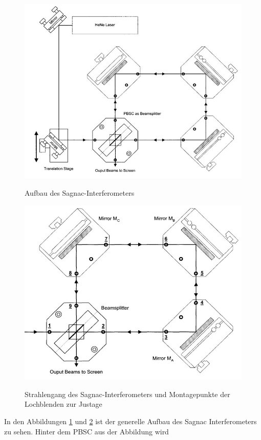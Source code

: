   \begin{figure}[H]
    \center
    \includegraphics[width=\textwidth]{Versuchsaufbau.JPG}
    \label{fig:aufbau}
    \caption{Aufbau des Sagnac-Interferometers}
  \end{figure}
  \begin{figure}[H]
    \center
    \includegraphics[width=\textwidth]{Strahlengang.JPG}
    \label{fig:bauteilpos}
    \caption{Strahlengang des Sagnac-Interferometers und Montagepunkte der Lochblenden zur Justage}
  \end{figure}
  In den Abbildungen \ref{fig:aufbau} und \ref{fig:bauteilpos} ist der generelle Aufbau des Sagnac Interferometers zu sehen. Hinter dem PBSC aus der Abbildung wird
